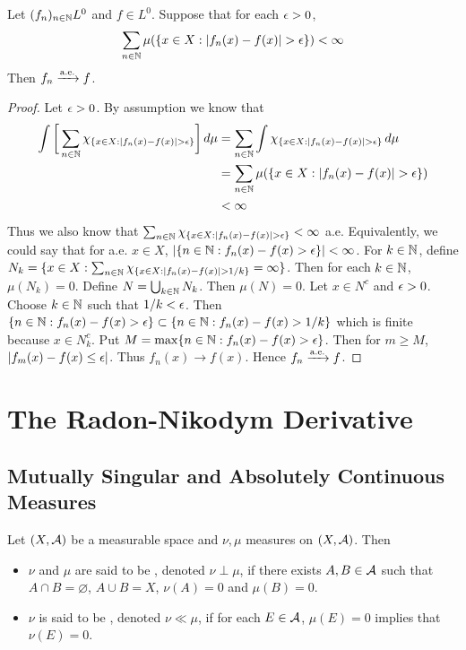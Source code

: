 \documentclass{book}
\begin{document}
	
	\begin{ex}  
		Let $(f_n)_{n \in \mathbb{N}} L^0$ and $f \in L^0$. Suppose that for each $\epsilon >0$, $$\sum_{n \in \mathbb{N}}\mu(\{x \in X: |f_n(x)-f(x)| > \epsilon\}) < \infty$$
		Then $f_n \xrightarrow{\text{a.e.}} f$.
	\end{ex}
	
	\begin{proof}
		Let $\epsilon>0$. By assumption we know that
		\begin{align*}
			\int \bigg[ \sum_{n \in \mathbb{N}}\chi_{\{x \in X: |f_n(x)-f(x)| > \epsilon\}}\bigg] \, d \mu 
			&= \sum_{n \in \mathbb{N}}\int \chi_{\{x \in X: |f_n(x)-f(x)| > \epsilon\}}\, d \mu\\
			&=\sum_{n \in \mathbb{N}}\mu(\{x \in X: |f_n(x)-f(x)| > \epsilon\})\\
			& < \infty
		\end{align*}
		Thus we also know that $\sum_{n \in \mathbb{N}}\chi_{\{x \in X: |f_n(x)-f(x)| > \epsilon\}} < \infty$ a.e. Equivalently, we could say that for a.e. $x \in X$, $|\{n \in \mathbb{N}: f_n(x) - f(x) > \epsilon\}| < \infty$. For $k \in \mathbb{N}$, define $N_k = \{x \in X: \sum_{n \in \mathbb{N}}\chi_{\{x \in X: |f_n(x)-f(x)| > 1/k\}} = \infty\}$. Then for each $k \in \mathbb{N}$, $\mu(N_k) = 0$. Define $N = \bigcup_{k \in \mathbb{N}} N_k$. Then $\mu(N) = 0$. Let $x \in N^c$ and $\epsilon > 0$. Choose $k \in \mathbb{N}$ such that $1/k < \epsilon$. Then $\{n \in \mathbb{N}: f_n(x) - f(x) > \epsilon\} \subset \{n \in \mathbb{N}: f_n(x) - f(x) > 1/k\}$ which is finite because $x \in N_k^c$. Put $M = \max\{n \in \mathbb{N}: f_n(x) - f(x) > \epsilon\}$. Then for $m \geq M$, $|f_m(x) - f(x) \leq \epsilon|$. Thus $f_n(x) \rightarrow f(x)$. Hence $f_n \xrightarrow{\text{a.e.}} f$.
	\end{proof}
	
	
	
	
	
	
	
	
	
	
	
	
	
	\newpage
	\chapter{The Radon-Nikodym Derivative}
	
	\section{Mutually Singular and Absolutely Continuous Measures}
	
	\begin{defn} 
		Let $(X, \mathcal{A})$ be a measurable space and $\nu, \mu$ measures on $(X, \mathcal{A})$. Then 
		\begin{itemize}
			\item $\nu$ and $\mu$ are said to be , denoted $\nu \perp \mu$, if there exists $A,B \in \mathcal{A}$ such that $A \cap B = \varnothing$, $A \cup B = X$, $\nu(A) = 0$ and $\mu(B) = 0$. 
			\item $\nu$ is said to be , denoted $\nu \ll \mu$, if for each $E \in \mathcal{A}$, $\mu(E) = 0$ implies that $\nu(E) = 0$.
		\end{itemize}
	\end{defn}
\end{document}
